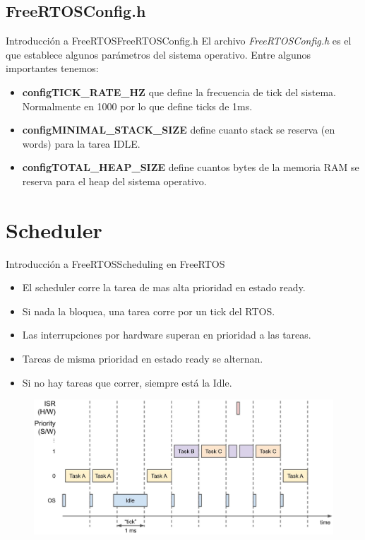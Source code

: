 \documentclass[aspectratio=169, xcolor=dvipsnames]{beamer}
\begin{document}
\subsection{FreeRTOSConfig.h}
\begin{frame}{Introducción a FreeRTOS}{FreeRTOSConfig.h}
El archivo \textit{FreeRTOSConfig.h} es el que establece algunos parámetros del sistema operativo. Entre algunos importantes tenemos:\newline
\begin{itemize}
    \item \textbf{configTICK\_RATE\_HZ} que define la frecuencia de tick del sistema. Normalmente en 1000 por lo que define ticks de 1ms.
    \item \textbf{configMINIMAL\_STACK\_SIZE} define cuanto stack se reserva (en words) para la tarea IDLE.
    \item \textbf{configTOTAL\_HEAP\_SIZE} define cuantos bytes de la memoria RAM se reserva para el heap del sistema operativo.
\end{itemize}
\end{frame}

\section{Scheduler}
\begin{frame}{Introducción a FreeRTOS}{Scheduling en FreeRTOS}
\begin{itemize}
    \item El scheduler corre la tarea de mas alta prioridad en estado ready.
    \item Si nada la bloquea, una tarea corre por un tick del RTOS.
    \item Las interrupciones por hardware superan en prioridad a las tareas.
    \item Tareas de misma prioridad en estado ready se alternan.
    \item Si no hay tareas que correr, siempre está la Idle.
\end{itemize}
\begin{figure}
\centering
\includegraphics[width=0.5\linewidth]{resources/images/scheduling.png}
\end{figure}
\end{frame}
\end{document}
